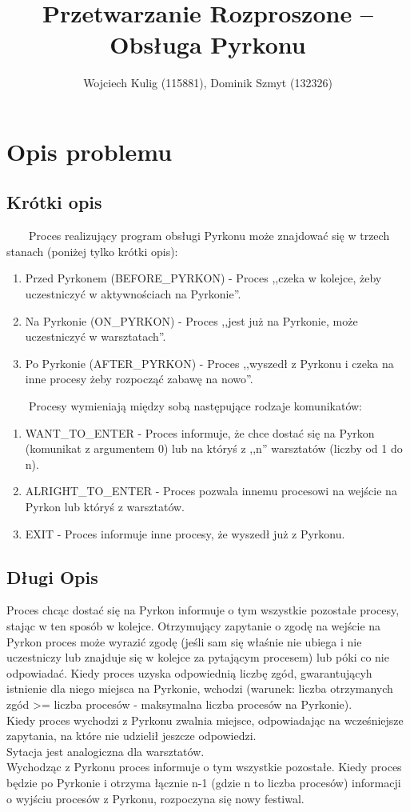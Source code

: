 \documentclass[11pt]{article}
\title{Przetwarzanie Rozproszone -- Obsługa Pyrkonu}
\author{Wojciech Kulig (115881), Dominik Szmyt (132326)}
\begin{document}
\maketitle

\section{Opis problemu}

\subsection{Krótki opis}
~~~~Proces realizujący program obsługi Pyrkonu może znajdować się w trzech stanach (poniżej tylko krótki opis):
\begin{enumerate}
\item Przed Pyrkonem (BEFORE\_PYRKON) - Proces ,,czeka w kolejce, żeby uczestniczyć w aktywnościach na Pyrkonie''.
\item Na Pyrkonie (ON\_PYRKON) - Proces ,,jest już na Pyrkonie, może uczestniczyć w warsztatach''.
\item Po Pyrkonie (AFTER\_PYRKON) - Proces ,,wyszedł z Pyrkonu i czeka na inne procesy żeby rozpocząć zabawę na nowo''.
\end{enumerate}
~~~~Procesy wymieniają między sobą następujące rodzaje komunikatów:
\begin{enumerate}
\item WANT\_TO\_ENTER - Proces informuje, że chce dostać się na Pyrkon (komunikat z argumentem 0) lub na któryś z ,,n'' warsztatów (liczby od 1 do n).
\item ALRIGHT\_TO\_ENTER - Proces pozwala innemu procesowi na wejście na Pyrkon lub któryś z warsztatów.
\item EXIT - Proces informuje inne procesy, że wyszedł już z Pyrkonu.
\end{enumerate}

\newpage

\subsection{Długi Opis} 
Proces chcąc dostać się na Pyrkon informuje o tym wszystkie pozostałe procesy, stając w ten sposób w kolejce. Otrzymujący zapytanie o zgodę na wejście na Pyrkon proces może wyrazić zgodę (jeśli sam się właśnie nie ubiega i nie uczestniczy lub znajduje się w kolejce za pytającym procesem) lub póki co nie odpowiadać. Kiedy proces uzyska odpowiednią liczbę zgód, gwarantującyh istnienie dla niego miejsca na Pyrkonie, wchodzi (warunek: liczba otrzymanych zgód >= liczba procesów - maksymalna liczba procesów na Pyrkonie).\\
Kiedy proces wychodzi z Pyrkonu zwalnia miejsce, odpowiadając na wcześniejsze zapytania, na które nie udzielił jeszcze odpowiedzi.\\
Sytacja jest analogiczna dla warsztatów.\\
Wychodząc z Pyrkonu proces informuje o tym wszystkie pozostałe. Kiedy proces będzie po Pyrkonie i otrzyma łącznie n-1 (gdzie n to liczba procesów) informacji o wyjściu procesów z Pyrkonu, rozpoczyna się nowy festiwal.\\
\end{document}
